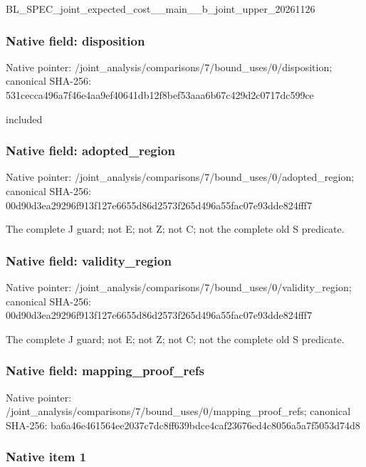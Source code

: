 \documentclass[10pt,a4paper]{article}
\begin{document}
BL\_SPEC\_joint\_expected\_c\allowbreak{}ost\_\_main\_\_b\_joint\_upper\allowbreak{}\_20261126


\subsubsection{Native field: disposition}


Native pointer: /joint\_analysis/comparis\allowbreak{}ons/7/bound\_uses/0/dispo\allowbreak{}sition; canonical SHA-256: 531cecca496a7f46e4aa9ef4\allowbreak{}0641db12f8bef53aaa6b67c4\allowbreak{}29d2c0717dc599ce


included


\subsubsection{Native field: adopted\_region}


Native pointer: /joint\_analysis/comparis\allowbreak{}ons/7/bound\_uses/0/adopt\allowbreak{}ed\_region; canonical SHA-256: 00d90d3ea29296f913f127e6\allowbreak{}655d86d2573f265d496a55fa\allowbreak{}c07e93dde824fff7


The complete J guard; not E; not Z; not C; not the complete old S predicate.


\subsubsection{Native field: validity\_region}


Native pointer: /joint\_analysis/comparis\allowbreak{}ons/7/bound\_uses/0/valid\allowbreak{}ity\_region; canonical SHA-256: 00d90d3ea29296f913f127e6\allowbreak{}655d86d2573f265d496a55fa\allowbreak{}c07e93dde824fff7


The complete J guard; not E; not Z; not C; not the complete old S predicate.


\subsubsection{Native field: mapping\_proof\_refs}


Native pointer: /joint\_analysis/comparis\allowbreak{}ons/7/bound\_uses/0/mappi\allowbreak{}ng\_proof\_refs; canonical SHA-256: ba6a46e461564ee2037c7dc8\allowbreak{}ff639bdce4caf23676ed4c80\allowbreak{}56a5a7f5053d74d8



\subsubsection{Native item 1}
\end{document}
